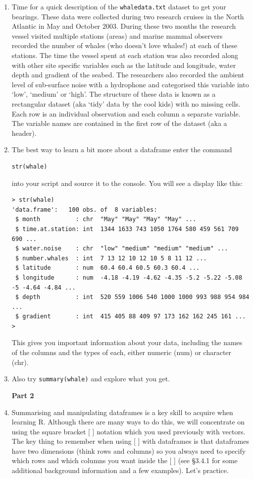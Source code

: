 \documentclass[12pt]{article}
\begin{document}
\begin{enumerate}
\item
Time for a quick description of the \verb|whaledata.txt| dataset to get your bearings. These data were collected during two research cruises in the North Atlantic in May and October 2003. During these two months the research vessel visited multiple stations (areas) and marine mammal observers recorded the number of whales (who doesn’t love whales!) at each of these stations. The time the vessel spent at each station was also recorded along with other site specific variables such as the latitude and longitude, water depth and gradient of the seabed. The researchers also recorded the ambient level of sub-surface noise with a hydrophone and categorised this variable into ‘low’, ‘medium’ or ‘high’. The structure of these data is known as a rectangular dataset (aka ‘tidy’ data by the cool kids) with no missing cells. Each row is an individual observation and each column a separate variable. The variable names are contained in the first row of the dataset (aka a header).

\item
The best way to learn a bit more about a dataframe enter the command
\begin{lstlisting}
str(whale)
\end{lstlisting}
 into your script and source it to the console.  You will 
see a display like this:
\begin{lstlisting}[basicstyle=\tiny]
> str(whale)
'data.frame':	100 obs. of  8 variables:
 $ month          : chr  "May" "May" "May" "May" ...
 $ time.at.station: int  1344 1633 743 1050 1764 580 459 561 709 690 ...
 $ water.noise    : chr  "low" "medium" "medium" "medium" ...
 $ number.whales  : int  7 13 12 10 12 10 5 8 11 12 ...
 $ latitude       : num  60.4 60.4 60.5 60.3 60.4 ...
 $ longitude      : num  -4.18 -4.19 -4.62 -4.35 -5.2 -5.22 -5.08 -5 -4.64 -4.84 ...
 $ depth          : int  520 559 1006 540 1000 1000 993 988 954 984 ...
 $ gradient       : int  415 405 88 409 97 173 162 162 245 161 ...
> 
 \end{lstlisting}
 This gives you important information about your data, including the names
 of the columns and the types of each, either numeric (num) or character (chr).

\item Also try \verb|summary(whale)| and explore what you get.

\centerline{\bf Part 2}

\item Summarising and manipulating dataframes is a key skill to acquire when learning R. Although there are many ways to do this, we will concentrate on using the square bracket [ ] notation which you used previously with vectors. The key thing to remember when using [ ] with dataframes is that dataframes have two dimensions (think rows and columns) so you always need to specify which rows and which columns you want inside the [ ] (see \S 3.4.1 for some additional background information and a few examples). Let's practice.


\end{enumerate}
\end{document}
